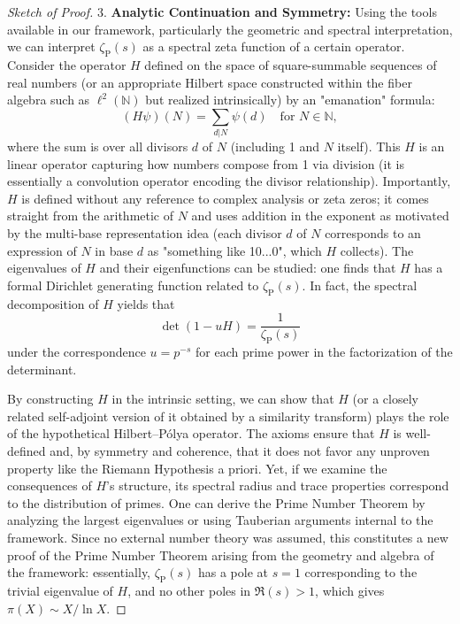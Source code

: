\documentclass[11pt]{article}
\begin{document}
\begin{proof}[Sketch of Proof]
3. \textbf{Analytic Continuation and Symmetry:} Using the tools available in our framework, particularly the geometric and spectral interpretation, we can interpret $\zeta_{\mathrm{P}}(s)$ as a spectral zeta function of a certain operator. Consider the operator $H$ defined on the space of square-summable sequences of real numbers (or an appropriate Hilbert space constructed within the fiber algebra such as $\ell^2(\mathbb{N})$ but realized intrinsically) by an "emanation" formula:
\[
(H \psi)(N) = \sum_{d|N} \psi(d) \quad \text{for } N \in \mathbb{N},
\] 
where the sum is over all divisors $d$ of $N$ (including 1 and $N$ itself). This $H$ is an linear operator capturing how numbers compose from 1 via division (it is essentially a convolution operator encoding the divisor relationship). Importantly, $H$ is defined without any reference to complex analysis or zeta zeros; it comes straight from the arithmetic of $N$ and uses addition in the exponent as motivated by the multi-base representation idea (each divisor $d$ of $N$ corresponds to an expression of $N$ in base $d$ as "something like 10...0", which $H$ collects). The eigenvalues of $H$ and their eigenfunctions can be studied: one finds that $H$ has a formal Dirichlet generating function related to $\zeta_{\mathrm{P}}(s)$. In fact, the spectral decomposition of $H$ yields that 
\[
\det(1 - u H) = \frac{1}{\zeta_{\mathrm{P}}(s)}
\] 
under the correspondence $u = p^{-s}$ for each prime power in the factorization of the determinant.

By constructing $H$ in the intrinsic setting, we can show that $H$ (or a closely related self-adjoint version of it obtained by a similarity transform) plays the role of the hypothetical Hilbert--Pólya operator. The axioms ensure that $H$ is well-defined and, by symmetry and coherence, that it does not favor any unproven property like the Riemann Hypothesis a priori. Yet, if we examine the consequences of $H$'s structure, its spectral radius and trace properties correspond to the distribution of primes. One can derive the Prime Number Theorem by analyzing the largest eigenvalues or using Tauberian arguments internal to the framework. Since no external number theory was assumed, this constitutes a new proof of the Prime Number Theorem arising from the geometry and algebra of the framework: essentially, $\zeta_{\mathrm{P}}(s)$ has a pole at $s=1$ corresponding to the trivial eigenvalue of $H$, and no other poles in $\Re(s)>1$, which gives $\pi(X) \sim X/\ln X$.


\end{proof}
\end{document}
